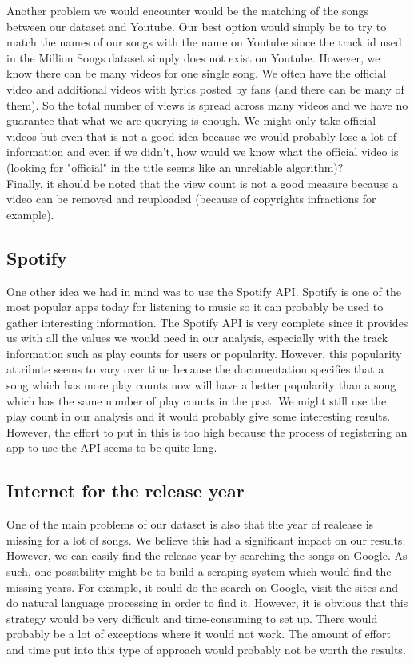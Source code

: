 \documentclass[11pt]{article}
\begin{document}
Another problem we would encounter would be the matching of the songs between our dataset and Youtube. Our best option would simply be to try to match the names of our songs with the name on Youtube since the track id used in the Million Songs dataset simply does not exist on Youtube. However, we know there can be many videos
for one single song. We often have the official video and additional videos with lyrics posted by fans (and there
can be many of them). So the total number of views is spread across many videos and we have no guarantee that what we are querying is enough. We might only take official videos but even that is not a good idea because we would probably lose a lot of information and even if we didn't, how would we know what the official video is (looking for "official" in the title seems like an unreliable algorithm)?\\
Finally, it should be noted that the view count is not a good measure because a video can be removed and reuploaded (because of copyrights infractions for example).

\subsection{Spotify}
One other idea we had in mind was to use the Spotify API. Spotify is one of the most
popular apps today for listening to music so it can probably be used to gather interesting information. The
Spotify API is very complete since it provides us with all the values we would need in our analysis,
especially with the track information such as play counts for users or popularity. However, this popularity
attribute seems to vary over time because the documentation specifies that a song which has more play
counts now will have a better popularity than a song which has the same number of play counts in the
past. We might still use the play count in our analysis and it would probably give some
interesting results. However, the effort to put in this is too high because the process of registering an app to use the API seems to be quite long.

\subsection{Internet for the release year}
One of the main problems of our dataset is also that the year of realease is missing for a lot of songs. We believe this had a significant impact on our results. However, we can easily find the release year by searching the songs on Google. As such, one possibility might be to build a scraping system which would find the missing years. For example, it could do the search on Google, visit the sites and do natural language processing in order to find it. However, it is obvious that this strategy would be very difficult and time-consuming to set up. There would probably be a lot of exceptions where it would not work. The amount of effort and time put into this type of approach would probably not be worth the results. 
\end{document}

